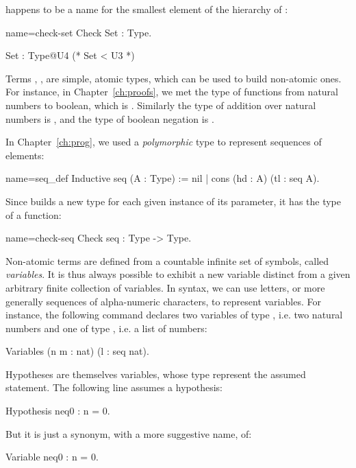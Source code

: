  happens to be a name for the smallest element of the
hierarchy of :

\begin{coq-left}{name=check-set}{}
Check Set : Type.
\end{coq-left}
\begin{coqout-right}
Set : Type@{U4} (* Set < U3 *)
\end{coqout-right}

Terms , ,  are simple, atomic types, which can be used
to build non-atomic ones. For instance, in Chapter~\ref{ch:proofs}, we
met the type of functions from natural numbers to boolean, which is .
Similarly the type of addition over natural numbers is 
, and the type of boolean negation is 
.

In Chapter~\ref{ch:prog}, we used a \emph{polymorphic} type to represent
sequences of elements:

\begin{coq}{name=seq_def}{}
Inductive seq (A : Type) := nil | cons (hd : A) (tl : seq A).
\end{coq}

Since  builds a new type for each given instance of its
parameter, it has the type of a function:

\begin{coq}{name=check-seq}{}
Check seq : Type -> Type.
\end{coq}

Non-atomic terms are defined from a countable infinite set of
symbols, called  \emph{variables}.
It is thus always possible to exhibit a new variable
distinct from a given arbitrary finite collection of variables. In \Coq{}
syntax, we can use letters, or more generally sequences of
alpha-numeric characters, to represent variables. For instance, the
following command declares two variables of type , i.e. two
natural numbers and one of type , i.e. a list of numbers:

\begin{coq}{}{}
Variables (n m : nat) (l : seq nat).
\end{coq}

Hypotheses are themselves variables, whose type represent the
assumed statement. The following line assumes a hypothesis:

\begin{coq}{}{}
Hypothesis neq0 : n = 0.
\end{coq}
But it is just a synonym, with a more suggestive name, of:
\begin{coq}{}{}
Variable neq0 : n = 0.
\end{coq}

